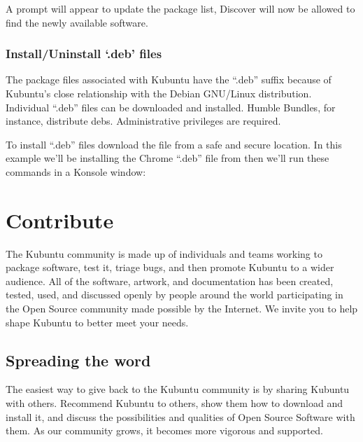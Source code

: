\documentclass[letterpaper,10pt,english]{sphinxmanual}
\begin{document}
\sphinxAtStartPar
A prompt will appear to update the package list, Discover will now be allowed to find the newly available software.


\subsection{Install/Uninstall ‘.deb’ files}
\label{\detokenize{docs/software-management/repositories:install-uninstall-deb-files}}
\sphinxAtStartPar
The package files associated with Kubuntu have the “.deb” suffix because of Kubuntu’s close relationship with the Debian GNU/Linux distribution. Individual “.deb” files can be downloaded and installed. Humble Bundles, for instance, distribute debs. Administrative privileges are required.

\sphinxAtStartPar
To install “.deb” files download the file from a safe and secure location. In this example we’ll be installing the Chrome “.deb” file from  then we’ll run these commands in a Konsole window:

\begin{sphinxVerbatim}[commandchars=\\\{\}]
   
   
\end{sphinxVerbatim}


\chapter{Contribute}
\label{\detokenize{docs/contribute:contribute}}\label{\detokenize{docs/contribute:contribute-link}}\label{\detokenize{docs/contribute::doc}}
\sphinxAtStartPar
The Kubuntu community is made up of individuals and teams working to package software, test it, triage bugs, and then promote Kubuntu to a wider audience. All of the software, artwork, and documentation has been created, tested, used, and discussed openly by people around the world participating in the Open Source community made possible by the Internet. We invite you to help shape Kubuntu to better meet your needs.


\section{Spreading the word}
\label{\detokenize{docs/contribute:spreading-the-word}}
\sphinxAtStartPar
The easiest way to give back to the Kubuntu community is by sharing Kubuntu with others. Recommend Kubuntu to others, show them how to download and install it, and discuss the possibilities and qualities of Open Source Software with them. As our community grows, it becomes more vigorous and supported.
\end{document}
